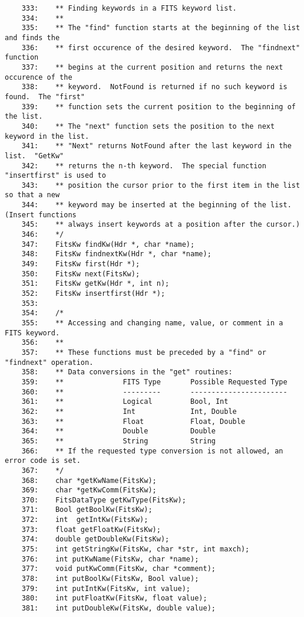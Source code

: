 \begin{scriptsize}
\begin{verbatim}
    333:    ** Finding keywords in a FITS keyword list.
    334:    **  
    335:    ** The "find" function starts at the beginning of the list and finds the 
    336:    ** first occurence of the desired keyword.  The "findnext" function  
    337:    ** begins at the current position and returns the next occurence of the 
    338:    ** keyword.  NotFound is returned if no such keyword is found.  The "first" 
    339:    ** function sets the current position to the beginning of the list.
    340:    ** The "next" function sets the position to the next keyword in the list.
    341:    ** "Next" returns NotFound after the last keyword in the list.  "GetKw"
    342:    ** returns the n-th keyword.  The special function "insertfirst" is used to
    343:    ** position the cursor prior to the first item in the list so that a new
    344:    ** keyword may be inserted at the beginning of the list.  (Insert functions
    345:    ** always insert keywords at a position after the cursor.)
    346:    */
    347:    FitsKw findKw(Hdr *, char *name);
    348:    FitsKw findnextKw(Hdr *, char *name);
    349:    FitsKw first(Hdr *);
    350:    FitsKw next(FitsKw);
    351:    FitsKw getKw(Hdr *, int n);
    352:    FitsKw insertfirst(Hdr *);
    353:    
    354:    /* 
    355:    ** Accessing and changing name, value, or comment in a FITS keyword.
    356:    ** 
    357:    ** These functions must be preceded by a "find" or "findnext" operation.
    358:    ** Data conversions in the "get" routines:
    359:    **              FITS Type       Possible Requested Type
    360:    **              ---------       -----------------------
    361:    **              Logical         Bool, Int
    362:    **              Int             Int, Double
    363:    **              Float           Float, Double
    364:    **              Double          Double
    365:    **              String          String
    366:    ** If the requested type conversion is not allowed, an error code is set.
    367:    */
    368:    char *getKwName(FitsKw);
    369:    char *getKwComm(FitsKw);
    370:    FitsDataType getKwType(FitsKw);
    371:    Bool getBoolKw(FitsKw);
    372:    int  getIntKw(FitsKw);
    373:    float getFloatKw(FitsKw);
    374:    double getDoubleKw(FitsKw);
    375:    int getStringKw(FitsKw, char *str, int maxch);
    376:    int putKwName(FitsKw, char *name);
    377:    void putKwComm(FitsKw, char *comment);
    378:    int putBoolKw(FitsKw, Bool value);
    379:    int putIntKw(FitsKw, int value);
    380:    int putFloatKw(FitsKw, float value);
    381:    int putDoubleKw(FitsKw, double value);

\end{verbatim}
\end{scriptsize}
